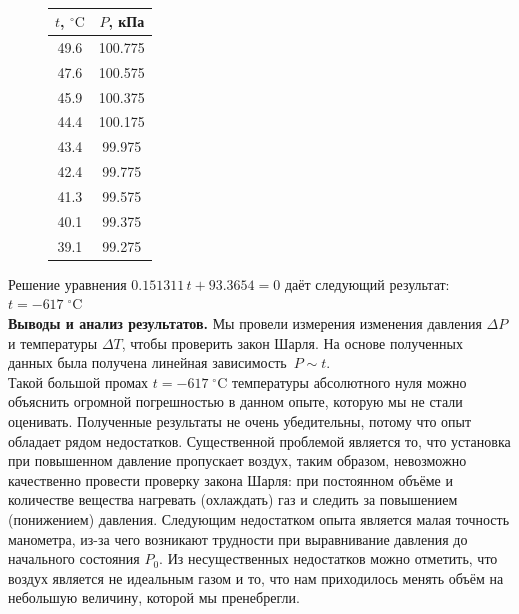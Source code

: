 \documentclass{article}
\begin{document}
	\begin{figure}[htb]
		\\
		
		\begin{tabular}{c|c}
			$t$, $^\circ\mbox{C}$&$P$, кПа\\
			\hline
			49.6&100.775\\
			47.6& 100.575\\
			45.9&100.375\\
			44.4& 100.175\\
			43.4& 99.975\\
			42.4& 99.775\\
			41.3&99.575\\
			40.1&99.375\\
			39.1&99.275\\
		\end{tabular}
	\end{figure}
	
	Решение уравнения $  0.151311\,t+93.3654=0$ даёт следующий результат: $ t=-617\;^\circ\mbox{C} $\\
	
	
	\textbf{Выводы и анализ результатов.}
	Мы провели измерения изменения давления $\Delta P$ и температуры $\Delta T$, чтобы проверить закон Шарля. На основе полученных данных была получена линейная зависимость~$P \sim t$.\\Такой большой промах $ t=-617\;^\circ\mbox{C} $ температуры абсолютного нуля можно объяснить огромной погрешностью в данном опыте, которую мы не стали оценивать. Полученные результаты не очень убедительны, потому что опыт обладает рядом недостатков. Существенной проблемой является то, что установка при повышенном давление пропускает воздух, таким образом, невозможно качественно провести проверку закона Шарля: при постоянном объёме и количестве вещества нагревать (охлаждать) газ и следить за повышением (понижением) давления. Следующим недостатком опыта является малая точность манометра, из-за чего возникают трудности при выравнивание давления до начального состояния $P_0$. Из несущественных недостатков можно отметить, что воздух является не идеальным газом и то, что нам приходилось менять объём на небольшую величину, которой мы пренебрегли.
	
\end{document}
